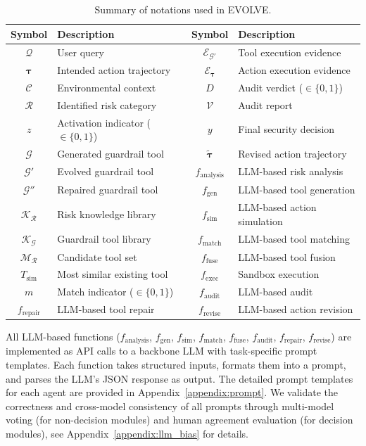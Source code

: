   \begin{table}[!t]
  \centering
  \caption{Summary of notations used in EVOLVE.}
  \label{tab:notation}
  \small
  \begin{tabular}{cl@{\hskip 1em}cl}
  \toprule
  \textbf{Symbol} & \textbf{Description} & \textbf{Symbol} & \textbf{Description} \\
  \midrule
  $\mathcal{Q}$ & User query & $\mathcal{E}_{\mathcal{G}'}$ & Tool execution evidence \\
  $\boldsymbol{\tau}$ & Intended action trajectory & $\mathcal{E}_{\boldsymbol{\tau}}$ & Action execution evidence \\
  $\mathcal{C}$ & Environmental context & $D$ & Audit verdict ($\in \{0,1\}$) \\
  $\mathcal{R}$ & Identified risk category & $\mathcal{V}$ & Audit report \\
  $z$ & Activation indicator ($\in \{0,1\}$) & $y$ & Final security decision \\
  $\mathcal{G}$ & Generated guardrail tool & $\tilde{\boldsymbol{\tau}}$ & Revised action trajectory \\
  $\mathcal{G}'$ & Evolved guardrail tool & $f_{\mathrm{analysis}}$ & LLM-based risk analysis \\
  $\mathcal{G}''$ & Repaired guardrail tool & $f_{\mathrm{gen}}$ & LLM-based tool generation \\
  $\mathcal{K}_{\mathcal{R}}$ & Risk knowledge library & $f_{\mathrm{sim}}$ & LLM-based action simulation \\
  $\mathcal{K}_{\mathcal{G}}$ & Guardrail tool library & $f_{\mathrm{match}}$ & LLM-based tool matching \\
  $\mathcal{M}_{\mathcal{R}}$ & Candidate tool set & $f_{\mathrm{fuse}}$ & LLM-based tool fusion \\
  $T_{\text{sim}}$ & Most similar existing tool & $f_{\mathrm{exec}}$ & Sandbox execution \\
  $m$ & Match indicator ($\in \{0,1\}$) & $f_{\mathrm{audit}}$ & LLM-based audit \\
  $f_{\mathrm{repair}}$ & LLM-based tool repair & $f_{\mathrm{revise}}$ & LLM-based action revision \\
  \bottomrule
  \end{tabular}
  \end{table}

  All LLM-based functions ($f_{\mathrm{analysis}}$, $f_{\mathrm{gen}}$, $f_{\mathrm{sim}}$, $f_{\mathrm{match}}$, $f_{\mathrm{fuse}}$, $f_{\mathrm{audit}}$, $f_{\mathrm{repair}}$, $f_{\mathrm{revise}}$) are implemented as API calls to a backbone LLM with task-specific prompt templates. Each function takes structured inputs, formats them into a prompt, and parses the LLM's JSON response as output. The detailed prompt templates for each agent are provided in Appendix~\ref{appendix:prompt}. We validate the correctness and cross-model consistency of all prompts through multi-model voting (for non-decision modules) and human agreement evaluation (for decision modules), see Appendix~\ref{appendix:llm_bias} for details.

